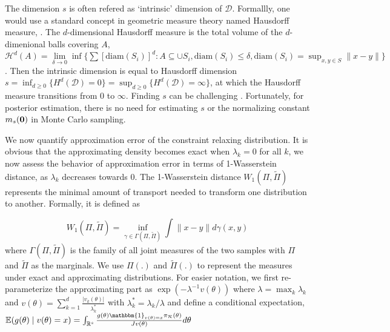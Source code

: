 \documentclass[10pt]{article}
\newcommand{\bb}[1]{\mathbb{#1}}
\newcommand{\mc}[1]{\mathcal{#1}}
\DeclareMathOperator{\1}{\mathbbm{1}}
\begin{document}
The dimension $s$ is often refered as `intrinsic' dimension of $\mc D$. Formallly, one would use a standard concept in geometric measure theory named Hausdorff measure,  \citep{federer2014geometric}. The $d$-dimensional Hausdorff measure is the total volume of the $d$-dimenional balls covering $A$, $\mc H^{d}(A)= \underset{\delta\rightarrow 0}\lim \inf \{ \sum \left[{\text{diam}(S_i)}\right]^d: {A\subseteq \cup S_i, \text{diam}(S_i)\le \delta}, \text{diam}(S_i)=\sup_{x,y\in S}\|x-y\|\}$. Then the intrinsic dimension is equal to Hausdorff dimension $s=\inf_{d\ge 0}\{H^d(\mc D)=0\}=\sup_{d\ge 0}\{H^d(\mc D)=\infty\}$, at which the Hausdorff measure transitions from $0$ to $\infty$. 	 Finding $s$ can be challenging \citep{mardia1975statistics,bowen1979hausdorff}. Fortunately, for posterior estimation, there is no need for estimating $s$ or the normalizing constant $m_s(\bf 0)$ in Monte Carlo sampling.

We now quantify approximation error of the constraint relaxing distribution. It is obvious that the approximating density becomes exact when $\lambda_k=0$ for all $k$, we now assess the behavior of approximation error in terms of 1-Wasserstein distance, as $\lambda_k$ decreases towards $0$. The 1-Wasserstein distance $W_1(\Pi,\tilde\Pi)$ represents the minimal amount of transport needed to transform one distribution to another. Formally, it is defined as

$$W_1(\Pi,\tilde\Pi)=\underset{\gamma\in \Gamma(\Pi,\tilde\Pi)}{\inf}\int \|x-y\| d\gamma(x,y)$$ 
where $\Gamma(\Pi,\tilde\Pi)$ is the family of all joint measures of the two samples with $\Pi$ and $\tilde\Pi$ as the marginals.
We use $\Pi(.)$ and $\tilde\Pi(.)$ to represent the measures under exact and approximating distributions. For easier notation, we first re-parameterize the approximating part as $\exp(-\lambda^{-1}  v(\theta))$ where $\lambda=\max_k \lambda_k$ and $v(\theta)=\sum_{k=1}^d\frac{|v_k(\theta)|}{\lambda^*_k}$ with $\lambda^*_k=\lambda_k/\lambda$ and define a conditional expectation, $\mathbb{E}(g(\theta) \mid v(\theta)=x)=  \int_{\bb R^s } \frac{ g(\theta) \mathbbm{1}_{v(\theta)=x} \pi_{\mc R}(\theta)}{ J v(\theta) } d \theta$




\end{document}
